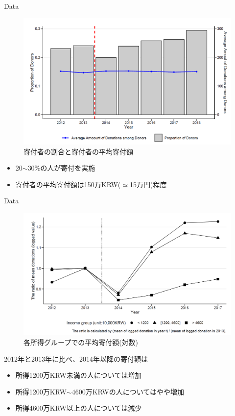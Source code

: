 \documentclass[dvipdfmx,10pt]{beamer}
\begin{document}
\begin{frame}{Data}
	\begin{figure}
		\centering
		\includegraphics[width=0.8\linewidth]{Fig_Average_donation}
		\caption{寄付者の割合と寄付者の平均寄付額}
		\label{fig:1}
	\end{figure}
\small
	\begin{itemize}
		\item 20$\sim$30\%の人が寄付を実施
		\item 寄付者の平均寄付額は150万KRW($\simeq$15万円)程度
	\end{itemize}
\end{frame}



\begin{frame}{Data}
	\begin{figure}
		\centering
		\includegraphics[width=0.7\linewidth]{Fig_Diff}
		\caption{各所得グループでの平均寄付額(対数)}
		\label{fig:3}
	\end{figure}
\small
	2012年と2013年に比べ、2014年以降の寄付額は
	\begin{itemize}
		\item 所得1200万KRW未満の人については増加
		\item 所得1200万KRW$\sim$4600万KRWの人についてはやや増加
		\item 所得4600万KRW以上の人については減少
	\end{itemize}
\end{frame}
\end{document}
